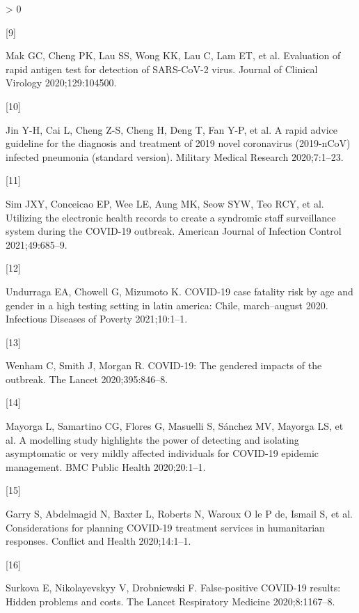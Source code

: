 \documentclass[]{elsarticle} %
\newlength{\cslhangindent}
\newlength{\csllabelwidth}
\newenvironment{CSLReferences}[2] %
 {%
  \setlength{\parindent}{0pt}
  \ifodd #1 \everypar{\setlength{\hangindent}{\cslhangindent}}\ignorespaces\fi
  \ifnum #2 > 0
  \setlength{\parskip}{#2\baselineskip}
  \fi
 }%
 {}
\newcommand{\CSLLeftMargin}[1]{\parbox[t]{\csllabelwidth}{#1}}
\newcommand{\CSLRightInline}[1]{\parbox[t]{\linewidth - \csllabelwidth}{#1}\break}
\begin{document}
\begin{CSLReferences}{0}{0}
\leavevmode\hypertarget{ref-mak2020evaluation}{}%
\CSLLeftMargin{{[}9{]} }
\CSLRightInline{Mak GC, Cheng PK, Lau SS, Wong KK, Lau C, Lam ET, et al.
Evaluation of rapid antigen test for detection of SARS-CoV-2 virus.
Journal of Clinical Virology 2020;129:104500.}

\leavevmode\hypertarget{ref-jin2020rapid}{}%
\CSLLeftMargin{{[}10{]} }
\CSLRightInline{Jin Y-H, Cai L, Cheng Z-S, Cheng H, Deng T, Fan Y-P, et
al. A rapid advice guideline for the diagnosis and treatment of 2019
novel coronavirus (2019-nCoV) infected pneumonia (standard version).
Military Medical Research 2020;7:1--23.}

\leavevmode\hypertarget{ref-sim2021utilizing}{}%
\CSLLeftMargin{{[}11{]} }
\CSLRightInline{Sim JXY, Conceicao EP, Wee LE, Aung MK, Seow SYW, Teo
RCY, et al. Utilizing the electronic health records to create a
syndromic staff surveillance system during the COVID-19 outbreak.
American Journal of Infection Control 2021;49:685--9.}

\leavevmode\hypertarget{ref-undurraga2021covid}{}%
\CSLLeftMargin{{[}12{]} }
\CSLRightInline{Undurraga EA, Chowell G, Mizumoto K. COVID-19 case
fatality risk by age and gender in a high testing setting in latin
america: Chile, march--august 2020. Infectious Diseases of Poverty
2021;10:1--1.}

\leavevmode\hypertarget{ref-wenham2020covid}{}%
\CSLLeftMargin{{[}13{]} }
\CSLRightInline{Wenham C, Smith J, Morgan R. COVID-19: The gendered
impacts of the outbreak. The Lancet 2020;395:846--8.}

\leavevmode\hypertarget{ref-mayorga2020modelling}{}%
\CSLLeftMargin{{[}14{]} }
\CSLRightInline{Mayorga L, Samartino CG, Flores G, Masuelli S, Sánchez
MV, Mayorga LS, et al. A modelling study highlights the power of
detecting and isolating asymptomatic or very mildly affected individuals
for COVID-19 epidemic management. BMC Public Health 2020;20:1--1.}

\leavevmode\hypertarget{ref-garry2020considerations}{}%
\CSLLeftMargin{{[}15{]} }
\CSLRightInline{Garry S, Abdelmagid N, Baxter L, Roberts N, Waroux O le
P de, Ismail S, et al. Considerations for planning COVID-19 treatment
services in humanitarian responses. Conflict and Health 2020;14:1--1.}

\leavevmode\hypertarget{ref-surkova2020false}{}%
\CSLLeftMargin{{[}16{]} }
\CSLRightInline{Surkova E, Nikolayevskyy V, Drobniewski F.
False-positive COVID-19 results: Hidden problems and costs. The Lancet
Respiratory Medicine 2020;8:1167--8.}


\end{CSLReferences}
\end{document}
